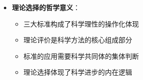\begin{center}
{{\begin{itemize}
\begin{itemize}
  \item \textbf{历史案例}：哥白尼日心说比托勒密地心说更简单
  \item \textbf{概念的复杂性}：简单性标准难以精确定义，不同理论可能在不同方面简单
  \item \textbf{应用的挑战}：简单性是重要标准，但难以公式化且应用存在困难
  \item \textbf{自然性的欺骗}：直觉上的"自然"可能是误导性的
  \end{itemize}
\item \textbf{理论选择的哲学意义}：
  \begin{itemize}
  \item 三大标准构成了科学理性的操作化体现
  \item 理论评价是科学方法的核心组成部分
  \item 标准的应用需要科学共同体的集体判断
  \item 理论选择体现了科学进步的内在逻辑
  \end{itemize}
\end{itemize}
}}
\end{center}